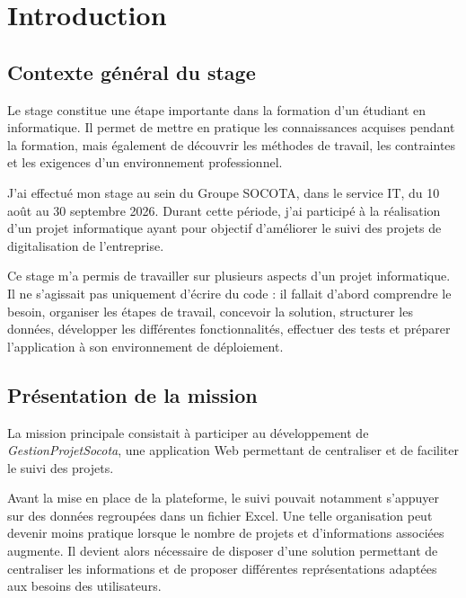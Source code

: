 \documentclass[12pt,a4paper,oneside]{report}
\begin{document}
\tableofcontents
\listoffigures
\clearpage
{}

\chapter{Introduction}

\section{Contexte général du stage}

Le stage constitue une étape importante dans la formation d'un étudiant en informatique. Il permet de mettre en pratique les connaissances acquises pendant la formation, mais également de découvrir les méthodes de travail, les contraintes et les exigences d'un environnement professionnel.

J'ai effectué mon stage au sein du Groupe SOCOTA, dans le service IT, du 10 août au 30 septembre 2026. Durant cette période, j'ai participé à la réalisation d'un projet informatique ayant pour objectif d'améliorer le suivi des projets de digitalisation de l'entreprise.

Ce stage m'a permis de travailler sur plusieurs aspects d'un projet informatique. Il ne s'agissait pas uniquement d'écrire du code : il fallait d'abord comprendre le besoin, organiser les étapes de travail, concevoir la solution, structurer les données, développer les différentes fonctionnalités, effectuer des tests et préparer l'application à son environnement de déploiement.

\section{Présentation de la mission}

La mission principale consistait à participer au développement de \textit{GestionProjetSocota}, une application Web permettant de centraliser et de faciliter le suivi des projets.

Avant la mise en place de la plateforme, le suivi pouvait notamment s'appuyer sur des données regroupées dans un fichier Excel. Une telle organisation peut devenir moins pratique lorsque le nombre de projets et d'informations associées augmente. Il devient alors nécessaire de disposer d'une solution permettant de centraliser les informations et de proposer différentes représentations adaptées aux besoins des utilisateurs.
\end{document}
